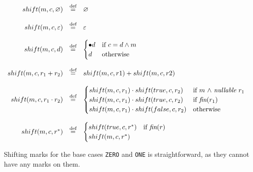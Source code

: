 \documentclass[12pt]{article}
\newcommand{\fin}{\textit{fin}}
\newcommand{\nullable}{\textit{nullable}}
\begin{document}
  \[
\begin{array}{rcl}
  shift(m,c,\varnothing)              & \stackrel{\text{def}}{=} & \varnothing \\\\
  shift(m,c,\varepsilon)              & \stackrel{\text{def}}{=} & \varepsilon \\\\
  shift(m,c,d)              & \stackrel{\text{def}}{=} &
   \begin{cases}
    \bullet d & \text{if  \( c=d \land m \)}\\
    d         & \text{otherwise}\\
   \end{cases} \\\\

  shift(m,c, r_1 + r_2)     & \stackrel{\text{def}}{=} & shift(m,c,r1) + shift(m,c,r2) \\\\
  shift(m,c, r_1 \cdot r_2) & \stackrel{\text{def}}{=} &
    \begin{cases}
      shift(m,c,r_1) \cdot shift(true,c,r_2)  & \text{if $m$ $\land$ $\nullable$  $r_1$ } \\
      shift(m,c,r_1) \cdot shift(true,c,r_2)  & \text{if $\fin(r_1)$} \\
      shift(m,c,r_1) \cdot shift(false,c,r_2) & \text{otherwise}
    \end{cases} \\\\
  shift(m,c, r^*)           & \stackrel{\text{def}}{=} &
    \begin{cases}
      shift(true,c,r^*) & \text{if $\fin(r)$} \\
      shift(m,c,r^*)    &  \\
    \end{cases}
\end{array}
\]

\noindent
Shifting marks for the base cases \texttt{ZERO} and \texttt{ONE} is straightforward, as they cannot have any marks on them.
\end{document}
